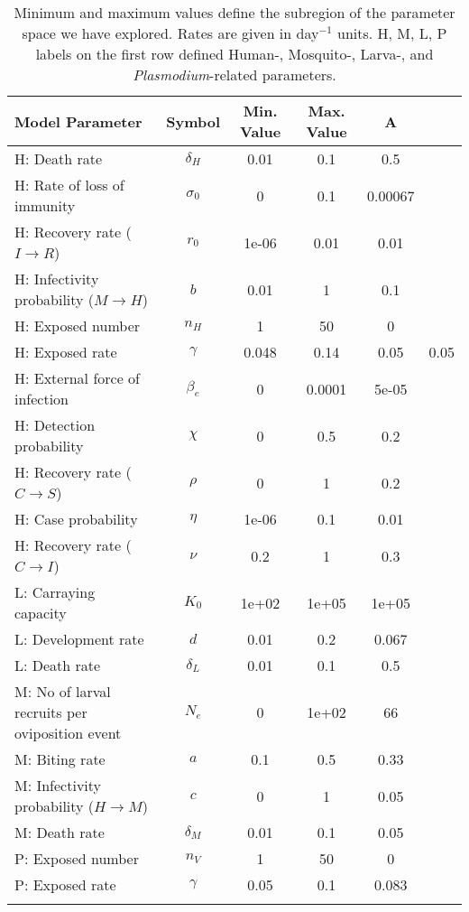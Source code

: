 \begin{table}
\begin{tabular}{p{5cm}ccccc}
{\bf Model Parameter} & {\bf Symbol} & {\bf Min. Value} & {\bf Max. Value} & {\bf A}\\
\hline\hline
  H: Death rate & $\delta_H$ & 0.01 &  0.1 &  0.5\\
  H: Rate of loss of immunity & $\sigma_0$ &    0 &  0.1 & 0.00067\\
  H: Recovery rate ($I \rightarrow R$) & $r_0$ & 1e-06 & 0.01 & 0.01 \\
  H: Infectivity probability ($M \rightarrow H$) & $b$ & 0.01 &    1 &  0.1\\
  H: Exposed number & $n_H$ &    1 &   50 &    0\\
  H: Exposed rate & $\gamma$ & 0.048 & 0.14 & 0.05 & 0.05\\
  H: External force of infection & $\beta_e$ &    0 & 0.0001 & 5e-05\\
  H: Detection probability & $\chi$ &    0 &  0.5 &  0.2\\
  H: Recovery rate ($C \rightarrow S$) & $\rho$ &    0 &    1 &  0.2\\
  H: Case probability & $\eta$ & 1e-06 &  0.1 & 0.01\\
  H: Recovery rate ($C \rightarrow I$) & $\nu$ &  0.2 &    1 &  0.3\\
\hline
  L: Carraying capacity & $K_0$ & 1e+02 & 1e+05 & 1e+05\\
  L: Development rate & $d$ & 0.01 &  0.2 & 0.067\\
  L: Death rate & $\delta_L$ & 0.01 &  0.1 &  0.5\\
  M: No of larval recruits per oviposition event & $N_e$ &    0 & 1e+02 &   66\\
  M: Biting rate & $a$ &  0.1 &  0.5 & 0.33\\
  M: Infectivity probability ($H \rightarrow M$) & $c$ &    0 &    1 & 0.05\\
  M: Death rate & $\delta_M$ & 0.01 &  0.1 & 0.05\\
\hline
  P: Exposed number & $n_V$ &    1 &   50 &    0\\
  P: Exposed rate & $\gamma$ & 0.05 &  0.1 & 0.083\\
\hline\hline
\smallskip
\end{tabular}
\caption {Minimum and maximum values define the subregion of the parameter space we have explored. Rates are given in day$^{-1}$ units. {\small H, M, L, P} labels on the first row defined Human-, Mosquito-, Larva-, and {\em Plasmodium}-related parameters. \label{Table_Full}} 
\end{table}
